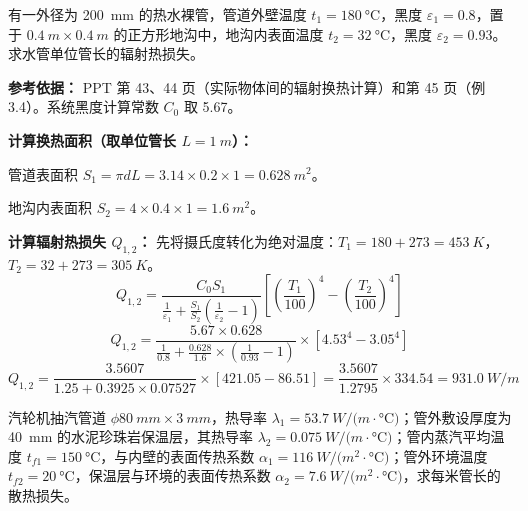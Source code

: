 \begin{problem}[封闭空间系统辐射换热量计算]
有一外径为 \qty{200}{mm} 的热水裸管，管道外壁温度 \(t_1 = \qty{180}{\degreeCelsius}\)，黑度 \(\varepsilon_1 = 0.8\)，置于 \(\qty{0.4}{m} \times \qty{0.4}{m}\) 的正方形地沟中，地沟内表面温度 \(t_2 = \qty{32}{\degreeCelsius}\)，黑度 \(\varepsilon_2 = 0.93\)。求水管单位管长的辐射热损失。
\end{problem}

\begin{solution}
\textbf{参考依据：} PPT 第 43、44 页（实际物体间的辐射换热计算）和第 45 页（例 3.4）。系统黑度计算常数 \(C_0\) 取 5.67。

\textbf{计算换热面积（取单位管长 \(L = \qty{1}{m}\)）：}

管道表面积 \(S_1 = \pi d L = 3.14 \times 0.2 \times 1 = \qty{0.628}{m^2}\)。

地沟内表面积 \(S_2 = 4 \times 0.4 \times 1 = \qty{1.6}{m^2}\)。

\textbf{计算辐射热损失 \(Q_{1,2}\)：} 先将摄氏度转化为绝对温度：\(T_1 = 180 + 273 = \qty{453}{K}\)，\(T_2 = 32 + 273 = \qty{305}{K}\)。
\begin{equation*}
  Q_{1,2} = \frac{C_0 S_1}{\frac{1}{\varepsilon_1} + \frac{S_1}{S_2}\left(\frac{1}{\varepsilon_2} - 1\right)}\left[\left(\frac{T_1}{100}\right)^4 - \left(\frac{T_2}{100}\right)^4\right]
\end{equation*}
\begin{equation*}
  Q_{1,2} = \frac{5.67 \times 0.628}{\frac{1}{0.8} + \frac{0.628}{1.6} \times \left(\frac{1}{0.93} - 1\right)} \times \left[4.53^4 - 3.05^4\right]
\end{equation*}
\begin{equation*}
  Q_{1,2} = \frac{3.5607}{1.25 + 0.3925 \times 0.07527} \times [421.05 - 86.51] = \frac{3.5607}{1.2795} \times 334.54 = \qty{931.0}{W/m}
\end{equation*}
\end{solution}

\begin{problem}[抽汽管道保温层复合换热计算]
汽轮机抽汽管道 \(\phi \qty{80}{mm} \times \qty{3}{mm}\)，热导率 \(\lambda_1 = \qty{53.7}{W/(m\cdot\degreeCelsius)}\)；管外敷设厚度为 \qty{40}{mm} 的水泥珍珠岩保温层，其热导率 \(\lambda_2 = \qty{0.075}{W/(m\cdot\degreeCelsius)}\)；管内蒸汽平均温度 \(t_{f1} = \qty{150}{\degreeCelsius}\)，与内壁的表面传热系数 \(\alpha_1 = \qty{116}{W/(m^2\cdot\degreeCelsius)}\)；管外环境温度 \(t_{f2} = \qty{20}{\degreeCelsius}\)，保温层与环境的表面传热系数 \(\alpha_2 = \qty{7.6}{W/(m^2\cdot\degreeCelsius)}\)，求每米管长的散热损失。
\end{problem}

